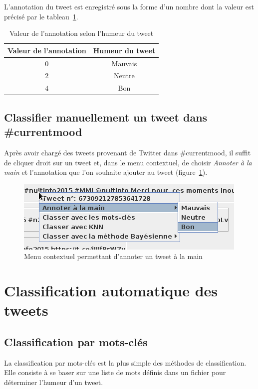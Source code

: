 \documentclass[12pt,a4paper]{report}
\newcommand{\CMName}{\#currentmood}
\begin{document}
L'annotation du tweet est enregistré sous la forme d'un nombre dont la valeur
est précisé par le tableau~\ref{tableau-valeurs-annotation}.

\begin{table}[h]
	\centering
	\begin{tabular}{c c}
		\textbf{Valeur de l'annotation}	& \textbf{Humeur du tweet}\\
		\midrule
		$0$				& Mauvais\\
		\midrule
		$2$				& Neutre\\
		\midrule
		$4$				& Bon
	\end{tabular}
	\caption{Valeur de l'annotation selon l'humeur du tweet}
	\label{tableau-valeurs-annotation}
\end{table}

\section{Classifier manuellement un tweet dans \CMName}
Après avoir chargé des tweets provenant de Twitter dans \CMName, il suffit de
cliquer droit sur un tweet et, dans le menu contextuel, de choisir
\textit{Annoter à la main} et l'annotation que l'on souhaite ajouter au tweet
(figure~\ref{capture-annoter-a-la-main}).

\begin{figure}
    \centering
    \includegraphics{img/capture-annoter-a-la-main.png}
    \caption{Menu contextuel permettant d'annoter un tweet à la main}
    \label{capture-annoter-a-la-main}
\end{figure}

\chapter{Classification automatique des tweets}
\label{chapter-classifications}

\section{Classification par mots-clés}
La classification par mots-clés est la plus simple des méthodes de
classification. Elle consiste à se baser sur une liste de mots définis dans un
fichier pour déterminer l'humeur d'un tweet.
\end{document}
